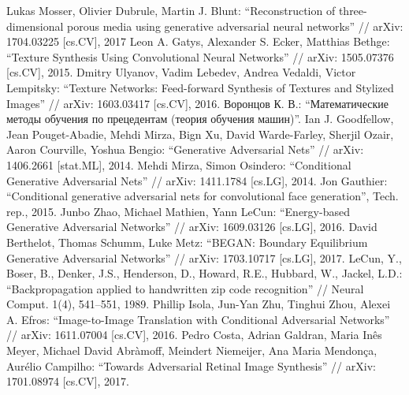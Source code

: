 \documentclass[a4paper]{article}
\begin{document}
	
	\setcounter{page}{2}
	\tableofcontents
	
	
	
	
	
	
	
	\clearpage
	\begin{thebibliography}{99}
		 Lukas Mosser, Olivier Dubrule, Martin J. Blunt: ``Reconstruction of three-dimensional porous media using generative adversarial neural networks'' // arXiv: 1704.03225 [cs.CV], 2017
		 Leon A. Gatys, Alexander S. Ecker, Matthias Bethge: ``Texture Synthesis Using Convolutional Neural Networks'' // arXiv: 1505.07376 [cs.CV], 2015.
		 Dmitry Ulyanov, Vadim Lebedev, Andrea Vedaldi, Victor Lempitsky: ``Texture Networks: Feed-forward Synthesis of Textures and Stylized Images'' // arXiv: 1603.03417 [cs.CV], 2016.
		  Воронцов К. В.: ``Математические методы обучения по прецедентам (теория обучения машин)''.
		 Ian J. Goodfellow, Jean Pouget-Abadie, Mehdi Mirza, Bign Xu, David Warde-Farley, Sherjil Ozair, Aaron Courville, Yoshua Bengio: ``Generative Adversarial Nets'' // arXiv: 1406.2661 [stat.ML], 2014.
		 Mehdi Mirza, Simon Osindero: ``Conditional Generative Adversarial Nets'' // arXiv: 1411.1784 [cs.LG], 2014.
		 Jon Gauthier: ``Conditional generative adversarial nets for convolutional face generation'', Tech. rep., 2015.
		 Junbo Zhao, Michael Mathien, Yann LeCun: ``Energy-based Generative Adversarial Networks'' // arXiv: 1609.03126 [cs.LG], 2016.
		 David Berthelot, Thomas Schumm, Luke Metz: ``BEGAN: Boundary Equilibrium Generative Adversarial Networks'' // arXiv: 1703.10717 [cs.LG], 2017.
		 LeCun, Y., Boser, B., Denker, J.S., Henderson, D., Howard, R.E., Hubbard, W., Jackel, L.D.: ``Backpropagation applied to handwritten zip code recognition'' // Neural Comput. 1(4), 541–551, 1989.
		 Phillip Isola, Jun-Yan Zhu, Tinghui Zhou, Alexei A. Efros: ``Image-to-Image Translation with Conditional Adversarial Networks'' // arXiv: 1611.07004 [cs.CV], 2016.
		 Pedro Costa, Adrian Galdran, Maria Inês Meyer, Michael David Abràmoff, Meindert Niemeijer, Ana Maria Mendonça, Aurélio Campilho: ``Towards Adversarial Retinal Image Synthesis'' // arXiv: 1701.08974 [cs.CV], 2017.

\end{thebibliography}
\end{document}
